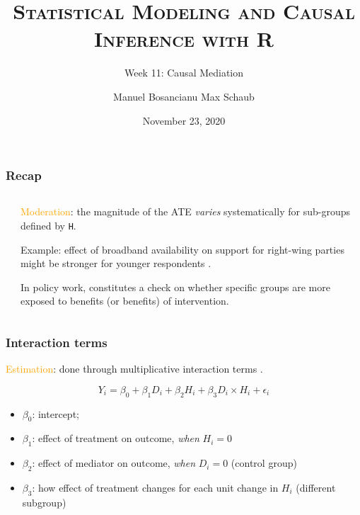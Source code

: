 \documentclass[11pt,english,dvipsnames,aspectratio=169,handout]{beamer}\usepackage[]{graphicx}\usepackage[]{xcolor}
\title{\textsc{Statistical Modeling and Causal Inference with R}}
\subtitle{Week 11: Causal Mediation}
\date{November 23, 2020}
\author{Manuel Bosancianu \hfill Max Schaub}
\institute{Hertie School of Governance}
\begin{document}
\maketitle

\begin{frame}
	\frametitle{Recap}
  
  \begin{columns}
		\begin{column}{0.3\textwidth}
		\end{column}
		\begin{column}{0.7\textwidth}
			\footnotesize
			\textcolor{orange}{Moderation}: the magnitude of the ATE \textit{varies} systematically for sub-groups defined by \texttt{H}.\bigskip
			\pause
			
			 Example: effect of broadband availability on support for right-wing parties might be stronger for younger respondents \cite{schaub_voter_2020}.\bigskip
			 \pause
			
			In policy work, constitutes a check on whether specific groups are more exposed to benefits (or benefits) of intervention.
			
		\end{column}
	\end{columns}

\end{frame}




\begin{frame}
\frametitle{Interaction terms}

  \textcolor{orange}{Estimation}: done through multiplicative interaction terms \cite{brambor_understanding_2006}.
  
  \begin{equation}
    Y_i = \beta_0 + \beta_1D_i + \beta_2H_i + \beta_3D_i\times H_i + \epsilon_i
  \end{equation}\pause
  

\begin{itemize}
  \item $\beta_0$: intercept;
  \item $\beta_1$: effect of treatment on outcome, \textit{when} $H_i = 0$
  \item $\beta_2$: effect of mediator on outcome, \textit{when} $D_i = 0$ (control group)
  \item $\beta_3$: how effect of treatment changes for each unit change in $H_i$ (different subgroup)
\end{itemize}

\end{frame}
\end{document}
